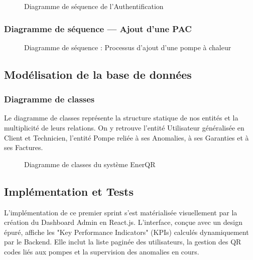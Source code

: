 \documentclass[12pt,a4paper]{report}
\begin{document}
\begin{figure}[H]
    \centering
    \vspace{4cm} %
    \caption{Diagramme de séquence de l'Authentification}
    \label{fig:seq_auth}
\end{figure}

\subsubsection{Diagramme de séquence — Ajout d'une PAC}
\begin{figure}[H]
    \centering
    \vspace{4cm} %
    \caption{Diagramme de séquence : Processus d'ajout d'une pompe à chaleur}
    \label{fig:seq_pac}
\end{figure}

\subsection{Modélisation de la base de données}
\subsubsection{Diagramme de classes}
Le diagramme de classes représente la structure statique de nos entités et la multiplicité de leurs relations. On y retrouve l'entité Utilisateur généralisée en Client et Technicien, l'entité Pompe reliée à ses Anomalies, à ses Garanties et à ses Factures.

\begin{figure}[H]
    \centering
    \vspace{6cm} %
    \caption{Diagramme de classes du système EnerQR}
    \label{fig:class_diagram}
\end{figure}

\subsection{Implémentation et Tests}
L'implémentation de ce premier sprint s'est matérialisée visuellement par la création du Dashboard Admin en React.js. L'interface, conçue avec un design épuré, affiche les "Key Performance Indicators" (KPIs) calculés dynamiquement par le Backend. Elle inclut la liste paginée des utilisateurs, la gestion des QR codes liés aux pompes et la supervision des anomalies en cours.
\end{document}
